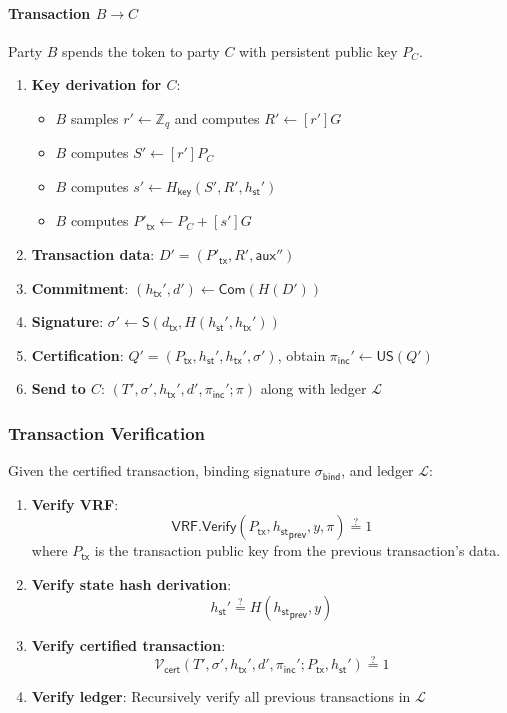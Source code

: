 \documentclass{article}
\newcommand{\sig}[0]{\mathsf{S}}
\newcommand{\commit}[0]{\mathsf{Com}}
\newcommand{\unisrv}[0]{\mathsf{US}}
\newcommand{\sthash}[0]{{h_\mathsf{st}}}
\newcommand{\txhash}[0]{{h_\mathsf{tx}}}
\newcommand{\auxd}[0]{\mathsf{aux}}
\newcommand{\certver}[0]{{\mathcal{V}_\mathsf{cert}}}
\newcommand{\pinc}[0]{{\pi_{\mathsf{inc}}}}
\begin{document}
\paragraph{Transaction $B \to C$}

Party $B$ spends the token to party $C$ with persistent public key $P_C$.

\begin{enumerate}
\item \textbf{Key derivation for $C$}:
\begin{itemize}
\item $B$ samples $r' \gets \mathbb{Z}_q$ and computes $R' \gets [r']G$
\item $B$ computes $S' \gets [r']P_C$
\item $B$ computes $s' \gets H_{\mathsf{key}}(S', R', \sthash')$
\item $B$ computes $P'_{\mathsf{tx}} \gets P_C + [s']G$
\end{itemize}

\item \textbf{Transaction data}: $D' = (P'_{\mathsf{tx}}, R', \auxd'')$

\item \textbf{Commitment}: $(\txhash', d') \gets \commit(H(D'))$

\item \textbf{Signature}: $\sigma' \gets \sig(d_{\mathsf{tx}}, H(\sthash', \txhash'))$

\item \textbf{Certification}: $Q' = (P_{\mathsf{tx}}, \sthash', \txhash', \sigma')$, obtain $\pinc' \gets \unisrv(Q')$

\item \textbf{Send to $C$}: $(T', \sigma', \txhash', d', \pinc'; \pi)$ along with ledger $\mathcal{L}$
\end{enumerate}

\subsubsection{Transaction Verification}

Given the certified transaction, binding signature $\sigma_{\mathsf{bind}}$, and ledger $\mathcal{L}$:

\begin{enumerate}
\item \textbf{Verify VRF}:
\[
\mathsf{VRF.Verify}(P_{\mathsf{tx}}, \sthash_{\mathsf{prev}}, y, \pi) \stackrel{?}{=} 1
\]
where $P_{\mathsf{tx}}$ is the transaction public key from the previous transaction's data.

\item \textbf{Verify state hash derivation}:
\[
\sthash' \stackrel{?}{=} H(\sthash_{\mathsf{prev}}, y)
\]

\item \textbf{Verify certified transaction}:
\[
\certver(T', \sigma', \txhash', d', \pinc'; P_{\mathsf{tx}}, \sthash') \stackrel{?}{=} 1
\]

\item \textbf{Verify ledger}: Recursively verify all previous transactions in $\mathcal{L}$
\end{enumerate}
\end{document}
